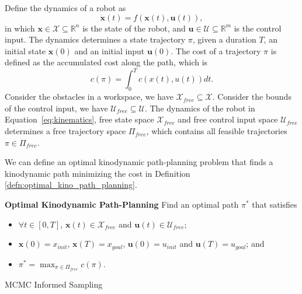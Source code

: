 \documentclass[letterpaper, 10 pt, conference]{ieeeconf}  %
\begin{document}
Define the dynamics of a robot as 
\begin{equation}
\label{eq:kinematics}
\dot{\bm{x}}(t) = f( \bm{x}(t) , \bm{u}(t) ), 
\end{equation}
in which $ \bm{x} \in \mathcal{X} \subseteq \mathbb{R}^n $ is the state of the robot, and $ \bm{u} \in \mathcal{U} \subseteq \mathbb{R}^m $ is the control input.
The dynamics determines a state trajectory $ \pi $, given a duration $ T $, an initial state $ \bm{x}(0) $ and an initial input $ \bm{u}(0) $.
The cost of a trajectory $ \pi $ is defined as the accumulated cost along the path, which is 
\begin{equation}
\label{eq:path_cost}
c(\pi) = \int_0^{T} c( x(t), u(t) ) dt.
\end{equation}
Consider the obstacles in a workspace, we have $ \mathcal{X}_{free} \subseteq \mathcal{X} $.
Consider the bounds of the control input, we have $ \mathcal{U}_{free} \subseteq \mathcal{U} $.
The dynamics of the robot in Equation~\eqref{eq:kinematics}, free state space $  \mathcal{X}_{free} $ and free control input space $ \mathcal{U}_{free} $ determines a free trajectory space $ \Pi_{free} $, which contains all feasible trajectories $ \pi \in \Pi_{free} $.

We can define an optimal kinodynamic path-planning problem that finds a kinodynamic path minimizing the cost in Definition \ref{defn:optimal_kino_path_planning}.
\begin{defn}{ \textbf{Optimal Kinodynamic Path-Planning} }
\label{defn:optimal_kino_path_planning}
	Find an optimal path $  \pi^* $ that satisfies
	\begin{itemize}
	\item $\forall t \in [0,T] $, $ \bm{x} (t) \in \mathcal{X}_{free}  $ and $ \bm{u} (t) \in \mathcal{U}_{free} $;
	\item $ \bm{x} (0) = x_{init} $, $ \bm{x} (T) = x_{goal} $, $ \bm{u} (0) = u_{init} $ and $ \bm{u} (T) = u_{goal} $; and
	\item $ \pi^* = \max_{ \pi \in \Pi_{free} } c( \pi ) $. 
	\end{itemize}
\end{defn}


\begin{algorithm}
	\begin{algorithmic}[1]
		\STATE
   	\end{algorithmic}
	\caption{MCMC Informed Sampling}
	\label{alg:mcmc_informed_sampling}
\end{algorithm}
\end{document}
